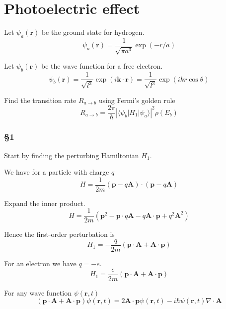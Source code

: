 

\section*{Photoelectric effect}

Let $\psi_a(\mathbf r)$ be the ground state for hydrogen.
\begin{equation*}
\psi_a(\mathbf r)=\frac{1}{\sqrt{\pi a^3}}\exp(-r/a)
\end{equation*}

Let $\psi_b(\mathbf r)$ be the wave function for a free electron.
\begin{equation*}
\psi_b(\mathbf r)=\frac{1}{\sqrt{l^3}}\exp(i\mathbf k\cdot\mathbf r)
=\frac{1}{\sqrt{l^3}}\exp(ikr\cos\theta)
\end{equation*}

Find the transition rate $R_{a\rightarrow b}$ using Fermi's golden rule
\begin{equation*}
R_{a\rightarrow b}=\frac{2\pi}{\hbar}\left|\langle\psi_b|H_1|\psi_a\rangle\right|^2\rho(E_b)
\end{equation*}

\subsubsection*{\S1}

Start by finding the perturbing Hamiltonian $H_1$.

\bigskip
We have for a particle with charge $q$
\begin{equation*}
H=\frac{1}{2m}(\mathbf p-q\mathbf A)\cdot(\mathbf p-q\mathbf A)
\end{equation*}

Expand the inner product.
\begin{equation*}
H=\frac{1}{2m}(\mathbf p^2-\mathbf p\cdot q\mathbf A-q\mathbf A\cdot\mathbf p+q^2\mathbf A^2)
\end{equation*}

Hence the first-order perturbation is
\begin{equation*}
H_1=-\frac{q}{2m}(\mathbf p\cdot\mathbf A+\mathbf A\cdot\mathbf p)
\end{equation*}

For an electron we have $q=-e$.
\begin{equation*}
H_1=\frac{e}{2m}(\mathbf p\cdot\mathbf A+\mathbf A\cdot\mathbf p)
\end{equation*}

For any wave function $\psi(\mathbf r,t)$
\begin{equation*}
(\mathbf p\cdot\mathbf A+\mathbf A\cdot\mathbf p)\psi(\mathbf r,t)
=2\mathbf A\cdot\mathbf p\psi(\mathbf r,t)-i\hbar\psi(\mathbf r,t)\nabla\cdot\mathbf A
\tag{1}
\end{equation*}


